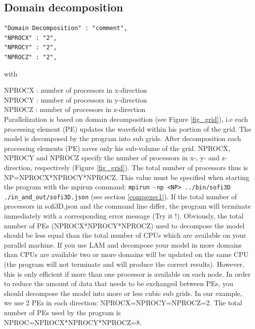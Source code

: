 \documentclass{hitec}
\begin{document}
\subsection{Domain decomposition}

\begin{verbatim}
"Domain Decomposition" : "comment",
"NPROCX" : "2",
"NPROCY" : "2",
"NPROCZ" : "2",
\end{verbatim}

with

NPROCX : number of processors in x-direction\\
NPROCY : number of processors in y-direction\\
NPROCZ : number of processors in z-direction\\



Parallelization is based on domain decomposition (see Figure \ref{fig_grid}), i.e each processing element (PE) updates the wavefield within his portion of the grid. The model is  decomposed
by the program into sub grids. After decomposition each processing elements (PE) saves only his sub-volume of the grid. NPROCX, NPROCY and NPROCZ specify the number of
processors in x-, y- and z-direction, respectively (Figure  \ref{fig_grid}). The total number of processors thus is NP=NPROCX*NPROCY*NPROCZ. This value must be specified when starting the program with the mpirun command:  \lstinline{mpirun -np <NP> ../bin/sofi3D ./in_and_out/sofi3D.json} (see section \ref{compexec1}). If the total number of processors in sofi3D.json
and the command line differ, the program will terminate immediately with a corresponding error message (Try it !). Obviously, the total number of PEs (NPROCX*NPROCY*NPROCZ) used to decompose the model  should be less equal than the total number of CPUs which are available on your parallel machine. If you use LAM and decompose your model in more domains than CPUs are available two or more  domains will be updated on the same CPU (the program will not terminate and will produce the correct results). However, this is only efficient if more than one processor is available on each node. In order to reduce the amount of data that needs to be  exchanged between PEs, you should decompose the model into more or less cubic sub grids. In our example, we use 2 PEs in each direction: NPROCX=NPROCY=NPROCZ=2. The total number of PEs used by the program is NPROC=NPROCX*NPROCY*NPROCZ=8. 
\end{document}
